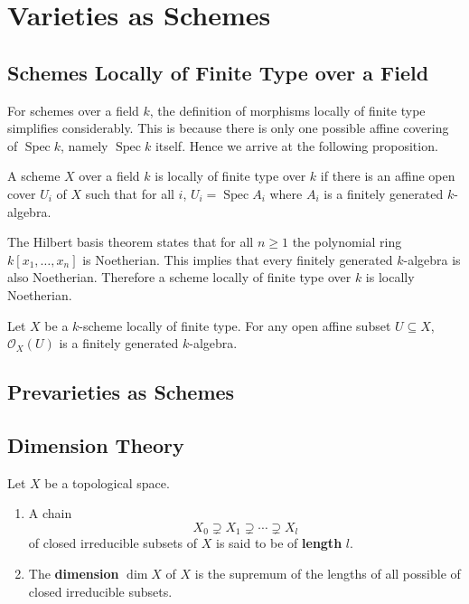 \documentclass[12pt]{book}
\newcommand{\inlinedef}[1]{\textcolor{oxfordblue}{\bfseries #1}}
\theoremstyle{definition}
\DeclareMathOperator{\Spec}{Spec}
\begin{document}
	\chapter{Varieties as Schemes}
	
	\section{Schemes Locally of Finite Type over a Field}
	
	For schemes over a field $k$, the definition of morphisms locally of finite type simplifies considerably. This is because there is only one possible affine covering of $\Spec k$, namely $\Spec k$ itself. Hence we arrive at the following proposition.
	
	\begin{proposition}
		A scheme $X$ over a field $k$ is locally of finite type over $k$ if there is an affine open cover $U_i$ of $X$ such that for all $i$, $U_i = \Spec A_i$ where $A_i$ is a finitely generated $k$-algebra.
	\end{proposition}
	
	The Hilbert basis theorem states that for all $n \geq 1$ the polynomial ring $k[x_1, \dotsc, x_n]$ is Noetherian. This implies that every finitely generated $k$-algebra is also Noetherian. Therefore a scheme locally of finite type over $k$ is locally Noetherian.
	
	\begin{proposition}
		Let $X$ be a $k$-scheme locally of finite type. For any open affine subset $U \subseteq X$, $\mathcal{O}_X(U)$ is a finitely generated $k$-algebra.
	\end{proposition}
	
	\section{Prevarieties as Schemes}
	
	\section{Dimension Theory}
	
	\begin{definition}
		Let $X$ be a topological space. 
		\begin{enumerate}
			\item A chain 
			\begin{equation*}
				X_0 \supsetneq X_1 \supsetneq \dotsb \supsetneq X_l
			\end{equation*}
			of closed irreducible subsets of $X$ is said to be of \inlinedef{length} $l$.
			
			\item The \inlinedef{dimension} $\dim X$ of $X$ is the supremum of the lengths of all possible of closed irreducible subsets.
		\end{enumerate}
	\end{definition}
	
\end{document}
